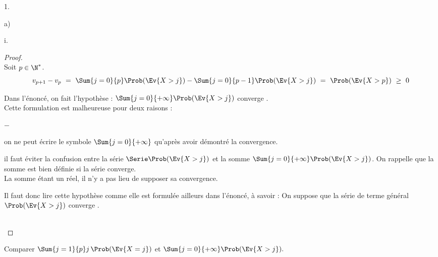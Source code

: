 \documentclass[11pt]{article}%
\begin{document}
\begin{noliste}{1.}
\begin{noliste}{a)}
\begin{nonoliste}{i.}
      \begin{proof}~\\%
        Soit $p \in \N^*$.
        \[
        v_{p+1} - v_p \ = \ \Sum{j = 0}{p} \Prob(\Ev{X > j}) - \Sum{j
          = 0}{p - 1} \Prob(\Ev{X > j}) \ = \ \Prob(\Ev{X > p}) \ \geq
        \ 0
        \]
        \begin{remark}%
          Dans l'énoncé, on fait l'hypothèse : \og $\Sum{j=0}{+\infty}
          \Prob(\Ev{X >j})$ converge \fg{}.\\
          Cette formulation est malheureuse pour deux raisons :
          \begin{noliste}{$-$}
          \item on ne peut écrire le symbole $\Sum{j=0}{+\infty}$
            qu'après avoir démontré la convergence.\\[-.4cm]
          \item il faut éviter la confusion entre la série $\Serie
            \Prob(\Ev{X >j})$ et la somme $\Sum{j=0}{+\infty}
            \Prob(\Ev{X >j})$. On rappelle que la somme est bien
            définie si la série converge.\\
            La somme étant un réel, il n'y a pas lieu de supposer sa
            convergence.
          \end{noliste}
          Il faut donc lire cette hypothèse comme elle est formulée
          ailleurs dans l'énoncé, à savoir : \og On suppose que la
          série de terme général $\Prob(\Ev{X > j})$ converge \fg{}.
        \end{remark}~\\[-1.4cm]
      \end{proof}

    \item Comparer $\Sum{j=1}{p} j \, \Prob(\Ev{X =j})$ et
      $\Sum{j=0}{+\infty} \Prob(\Ev{X >j}).$
    \end{nonoliste}


\end{noliste}
\end{noliste}
\end{document}
